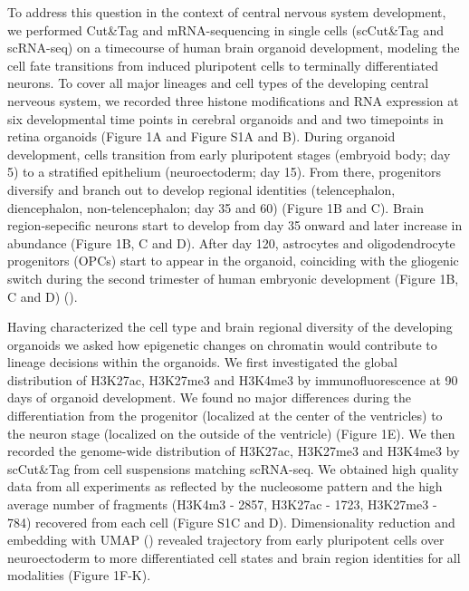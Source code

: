 To address this question in the context of central nervous system development, we performed Cut\&Tag and mRNA-sequencing in single cells (scCut\&Tag and scRNA-seq) on a timecourse of human brain organoid development, modeling the cell fate transitions from induced pluripotent cells to terminally differentiated neurons. To cover all major lineages and cell types of the developing central nerveous system, we recorded three histone modifications and RNA expression at six developmental time points in cerebral organoids and and two timepoints in retina organoids (Figure 1A and Figure S1A and B). During organoid development, cells transition from early pluripotent stages (embryoid body; day 5) to a stratified epithelium (neuroectoderm; day 15). From there, progenitors diversify and branch out to develop regional identities (telencephalon, diencephalon, non-telencephalon; day 35 and 60) (Figure 1B and C). Brain region-sepecific neurons start to develop from day 35 onward and later increase in abundance (Figure 1B, C and D). After day 120, astrocytes and oligodendrocyte progenitors (OPCs) start to appear in the organoid, coinciding with the gliogenic switch during the second trimester of human embryonic development (Figure 1B, C and D) (\cite{rowitch_developmental_2010}). 

Having characterized the cell type and brain regional diversity of the developing organoids we asked how epigenetic changes on chromatin would contribute to lineage decisions within the organoids. We first investigated the global distribution of H3K27ac, H3K27me3 and H3K4me3 by immunofluorescence at 90 days of organoid development. We found no major differences during the differentiation from the progenitor (localized at the center of the ventricles) to the neuron stage (localized on the outside of the ventricle) (Figure 1E). We then recorded the genome-wide distribution of H3K27ac, H3K27me3 and H3K4me3 by scCut\&Tag from cell suspensions matching scRNA-seq. We obtained high quality data from all experiments as reflected by the nucleosome pattern and the high average number of fragments (H3K4m3 - 2857, H3K27ac - 1723, H3K27me3 - 784) recovered from each cell (Figure S1C and D). Dimensionality reduction and embedding with UMAP (\cite{mcinnes_umap_2018}) revealed trajectory from early pluripotent cells over neuroectoderm to more differentiated cell states and brain region identities for all modalities (Figure 1F-K).

